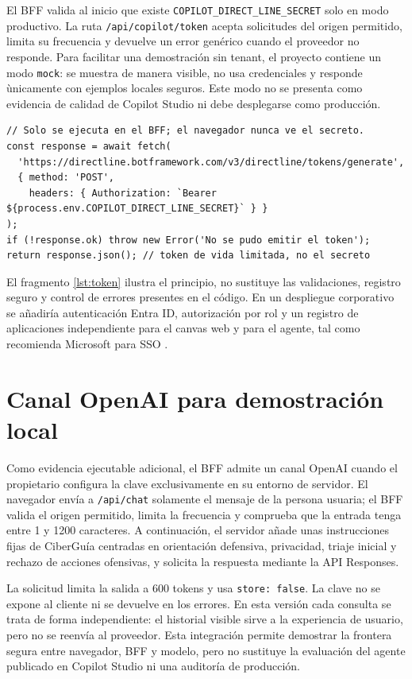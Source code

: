 \documentclass[12pt,twoside,titlepage]{book}
\begin{document}
El BFF valida al inicio que existe \texttt{COPILOT\_DIRECT\_LINE\_SECRET} solo en modo productivo. La ruta \texttt{/api/copilot/token} acepta solicitudes del origen permitido, limita su frecuencia y devuelve un error gen\'erico cuando el proveedor no responde. Para facilitar una demostraci\'on sin tenant, el proyecto contiene un modo \texttt{mock}: se muestra de manera visible, no usa credenciales y responde \`unicamente con ejemplos locales seguros. Este modo no se presenta como evidencia de calidad de Copilot Studio ni debe desplegarse como producci\'on.

\begin{lstlisting}[caption={Patr\'on simplificado de canje de secreto en el servidor.},label={lst:token}]
// Solo se ejecuta en el BFF; el navegador nunca ve el secreto.
const response = await fetch(
  'https://directline.botframework.com/v3/directline/tokens/generate',
  { method: 'POST',
    headers: { Authorization: `Bearer ${process.env.COPILOT_DIRECT_LINE_SECRET}` } }
);
if (!response.ok) throw new Error('No se pudo emitir el token');
return response.json(); // token de vida limitada, no el secreto
\end{lstlisting}

El fragmento \ref{lst:token} ilustra el principio, no sustituye las validaciones, registro seguro y control de errores presentes en el c\'odigo. En un despliegue corporativo se a\~nadir\'ia autenticaci\'on Entra ID, autorizaci\'on por rol y un registro de aplicaciones independiente para el canvas web y para el agente, tal como recomienda Microsoft para SSO \cite{copilotSso}.

\section{Canal OpenAI para demostraci\'on local}

Como evidencia ejecutable adicional, el BFF admite un canal OpenAI cuando el propietario configura la clave exclusivamente en su entorno de servidor. El navegador env\'ia a \texttt{/api/chat} solamente el mensaje de la persona usuaria; el BFF valida el origen permitido, limita la frecuencia y comprueba que la entrada tenga entre 1 y 1200 caracteres. A continuaci\'on, el servidor a\~nade unas instrucciones fijas de CiberGu\'ia centradas en orientaci\'on defensiva, privacidad, triaje inicial y rechazo de acciones ofensivas, y solicita la respuesta mediante la API Responses.

La solicitud limita la salida a 600 tokens y usa \texttt{store: false}. La clave no se expone al cliente ni se devuelve en los errores. En esta versi\'on cada consulta se trata de forma independiente: el historial visible sirve a la experiencia de usuario, pero no se reenv\'ia al proveedor. Esta integraci\'on permite demostrar la frontera segura entre navegador, BFF y modelo, pero no sustituye la evaluaci\'on del agente publicado en Copilot Studio ni una auditor\'ia de producci\'on.
\end{document}
